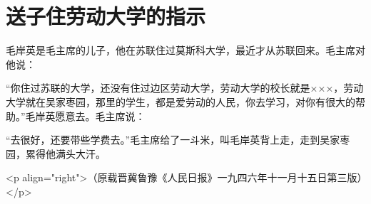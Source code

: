 \section[送子住劳动大学的指示（一九四六年）]{送子住劳动大学的指示}


毛岸英是毛主席的儿子，他在苏联住过莫斯科大学，最近才从苏联回来。毛主席对他说：

“你住过苏联的大学，还没有住过边区劳动大学，劳动大学的校长就是×××，劳动大学就在吴家枣园，那里的学生，都是爱劳动的人民，你去学习，对你有很大的帮助。”毛岸英愿意去。毛主席说：

“去很好，还要带些学费去。”毛主席给了一斗米，叫毛岸英背上走，走到吴家枣园，累得他满头大汗。

<p align="right">（原载晋冀鲁豫《人民日报》一九四六年十一月十五日第三版）</p>

